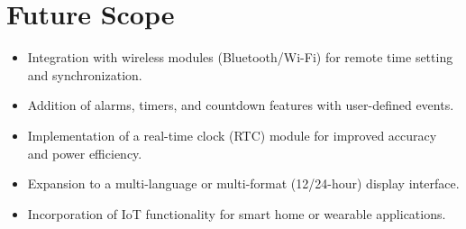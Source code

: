 \section*{Future Scope}
\begin{itemize}
\item Integration with wireless modules (Bluetooth/Wi-Fi) for remote time setting and synchronization.
\item Addition of alarms, timers, and countdown features with user-defined events.
\item Implementation of a real-time clock (RTC) module for improved accuracy and power efficiency.
\item Expansion to a multi-language or multi-format (12/24-hour) display interface.
\item Incorporation of IoT functionality for smart home or wearable applications.
\end{itemize}
